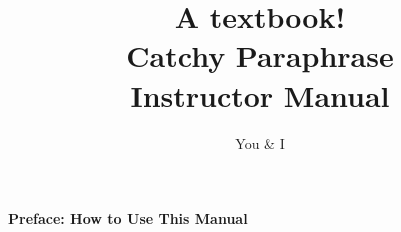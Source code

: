 \documentclass[letterpaper, 10pt]{memoir}
\begin{document}
\frontmatter
\title{{\Huge A textbook!} \\
		Catchy Paraphrase\\
		Instructor Manual}
\author{You & I}
\date{}
\maketitle


\tableofcontents

\mainmatter 					%

\textbf{Preface: How to Use This Manual}\\



\end{document}
